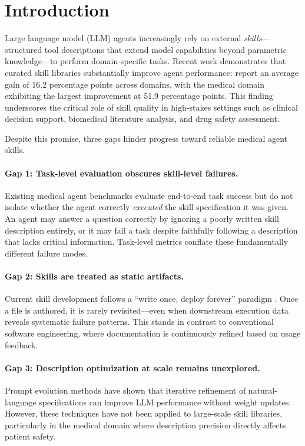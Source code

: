 \section{Introduction}
\label{sec:intro}

Large language model (LLM) agents increasingly rely on external \emph{skills}---structured tool descriptions that extend model capabilities beyond parametric knowledge---to perform domain-specific tasks.
Recent work demonstrates that curated skill libraries substantially improve agent performance: \citet{skillsbench2026} report an average gain of 16.2 percentage points across domains, with the medical domain exhibiting the largest improvement at 51.9 percentage points.
This finding underscores the critical role of skill quality in high-stakes settings such as clinical decision support, biomedical literature analysis, and drug safety assessment.

Despite this promise, three gaps hinder progress toward reliable medical agent skills.

\paragraph{Gap 1: Task-level evaluation obscures skill-level failures.}
Existing medical agent benchmarks evaluate end-to-end task success \citep{healthbench2025, medagentbench2025, labbench2024} but do not isolate whether the agent correctly \emph{executed} the skill specification it was given.
An agent may answer a question correctly by ignoring a poorly written skill description entirely, or it may fail a task despite faithfully following a description that lacks critical information.
Task-level metrics conflate these fundamentally different failure modes.
    
\paragraph{Gap 2: Skills are treated as static artifacts.}
Current skill development follows a ``write once, deploy forever'' paradigm \citep{skillnet2026, easytool2024}.
Once a \skillmd file is authored, it is rarely revisited---even when downstream execution data reveals systematic failure patterns.
This stands in contrast to conventional software engineering, where documentation is continuously refined based on usage feedback.

\paragraph{Gap 3: Description optimization at scale remains unexplored.}
Prompt evolution methods \citep{gepa2025, play2prompt2025} have shown that iterative refinement of natural-language specifications can improve LLM performance without weight updates.
However, these techniques have not been applied to large-scale skill libraries, particularly in the medical domain where description precision directly affects patient safety.

